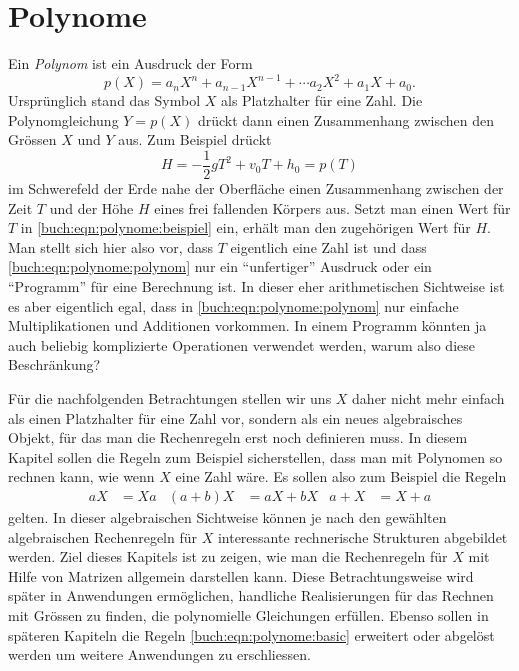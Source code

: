 %
%
%
\chapter{Polynome
\label{buch:chapter:polynome}}
Ein {\em Polynom} ist ein Ausdruck der Form
%
\begin{equation}
p(X) = a_nX^n+a_{n-1}X^{n-1} + \cdots a_2X^2 + a_1X + a_0.
\label{buch:eqn:polynome:polynom}
\end{equation}
Ursprünglich stand das Symbol $X$ als Platzhalter für eine Zahl.
Die Polynomgleichung $Y=p(X)$ drückt dann einen Zusammenhang zwischen
den Grössen $X$ und $Y$ aus.
Zum Beispiel drückt
\begin{equation}
H = -\frac12gT^2 + v_0T +h_0 = p(T)
\label{buch:eqn:polynome:beispiel}
\end{equation}
im Schwerefeld der Erde nahe der Oberfläche einen Zusammenhang
zwischen der Zeit $T$ und der Höhe $H$ eines frei fallenden Körpers aus.
Setzt man einen Wert für $T$ in \eqref{buch:eqn:polynome:beispiel} ein,
erhält man den zugehörigen Wert für $H$.
Man stellt sich hier also vor, dass $T$ eigentlich eine Zahl ist und dass
\eqref{buch:eqn:polynome:polynom}
nur ein ``unfertiger'' Ausdruck oder ein ``Programm'' für eine Berechnung
ist.
In dieser eher arithmetischen Sichtweise ist es aber eigentlich egal, dass in
%
\eqref{buch:eqn:polynome:polynom} nur einfache Multiplikationen und
Additionen vorkommen.
In einem Programm könnten ja auch beliebig komplizierte Operationen
verwendet werden, warum also diese Beschränkung?

Für die nachfolgenden Betrachtungen stellen wir uns $X$ daher nicht
mehr einfach als einen Platzhalter für eine Zahl vor, sondern als ein neues
algebraisches Objekt, für das man die Rechenregeln erst noch definieren muss.
In diesem Kapitel sollen die Regeln zum Beispiel sicherstellen,
dass man mit Polynomen so rechnen kann, wie wenn $X$ eine Zahl wäre.
Es sollen also zum Beispiel die Regeln
\begin{align}
aX&=Xa
&
(a+b)X&=aX+bX
&
a+X &= X+a
\label{buch:eqn:polynome:basic}
\end{align}
gelten.
In dieser algebraischen Sichtweise können je nach den gewählten algebraischen
Rechenregeln für $X$ interessante rechnerische Strukturen abgebildet werden.
%
Ziel dieses Kapitels ist zu zeigen, wie man die Rechenregeln für $X$
mit Hilfe von Matrizen allgemein darstellen kann.
Diese Betrachtungsweise wird später in Anwendungen ermöglichen,
handliche Realisierungen für das Rechnen mit Grössen zu finden,
die polynomielle Gleichungen erfüllen.
Ebenso sollen in späteren Kapiteln die Regeln
\eqref{buch:eqn:polynome:basic}
erweitert oder abgelöst werden um weitere Anwendungen zu erschliessen.

